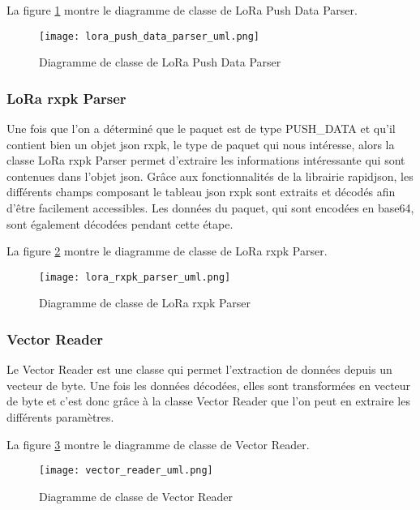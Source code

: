 La figure \ref{fig:lora_push_data_parser_uml} montre le diagramme de classe de LoRa Push Data Parser.

\begin{figure}[htb]
\centering 
\texttt{[image: lora\_push\_data\_parser\_uml.png]} 
\caption{Diagramme de classe de LoRa Push Data Parser}
\label{fig:lora_push_data_parser_uml}
 \end{figure}

\subsubsection{LoRa rxpk Parser}

Une fois que l'on a déterminé que le paquet est de type PUSH\_DATA et qu'il contient bien un objet json rxpk, le type de paquet qui nous intéresse, alors la classe LoRa rxpk Parser permet d'extraire les informations intéressante qui sont contenues dans l'objet json. Grâce aux fonctionnalités de la librairie rapidjson, les différents champs composant le tableau json rxpk sont extraits et décodés afin d'être facilement accessibles. Les données du paquet, qui sont encodées en base64, sont également décodées pendant cette étape.

La figure \ref{fig:lora_rxpk_parser_uml} montre le diagramme de classe de LoRa rxpk Parser.

\begin{figure}[htb]
\centering 
\texttt{[image: lora\_rxpk\_parser\_uml.png]} 
\caption{Diagramme de classe de LoRa rxpk Parser}
\label{fig:lora_rxpk_parser_uml}
 \end{figure}

\subsubsection{Vector Reader}

Le Vector Reader est une classe qui permet l'extraction de données depuis un vecteur de byte.  Une fois les données décodées, elles sont transformées en vecteur de byte et c'est donc grâce à la classe Vector Reader que l'on peut en extraire les différents paramètres.

La figure \ref{fig:vector_reader_uml} montre le diagramme de classe de Vector Reader.

\begin{figure}[htb]
\centering 
\texttt{[image: vector\_reader\_uml.png]} 
\caption{Diagramme de classe de Vector Reader}
\label{fig:vector_reader_uml}
 \end{figure}

